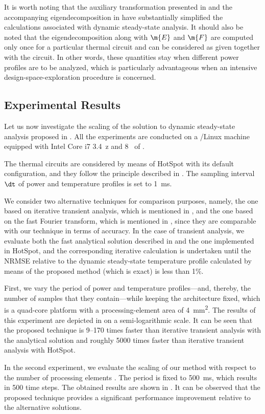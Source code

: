 It is worth noting that the auxiliary transformation presented in
 and the accompanying eigendecomposition in
 have substantially simplified the calculations
associated with dynamic steady-state analysis. It should also be noted that the
eigendecomposition along with $\m{E}$ and $\m{F}$ are computed only once for a
particular thermal  circuit and can be considered as given together with
the circuit. In other words, these quantities stay when different power profiles
are to be analyzed, which is particularly advantageous when an intensive
design-space-exploration procedure is concerned.

\subsection{Experimental Results}

Let us now investigate the scaling of the solution to dynamic steady-state
analysis proposed in . All the experiments
are conducted on a /Linux machine equipped with Intel Core i7
3.4~z and 8~ of .

The thermal  circuits are considered by means of HotSpot
\cite{skadron2003} with its default configuration, and they follow the principle
described in . The sampling interval $\dt$ of power and
temperature profiles is set to 1~ms.

We consider two alternative techniques for comparison purposes, namely, the one
based on iterative transient analysis, which is mentioned in
, and the one based on the fast Fourier
transform, which is mentioned in , since
they are comparable with our technique in terms of accuracy. In the case of
transient analysis, we evaluate both the fast analytical solution described in
 and the one implemented in HotSpot, and the
corresponding iterative calculation is undertaken until the \ac{NRMSE} relative
to the dynamic steady-state temperature profile calculated by means of the
proposed method (which is exact) is less than 1\%.

First, we vary the period \period of power and temperature profiles---and,
thereby, the number of samples \ns that they contain---while keeping the
architecture fixed, which is a quad-core platform with a processing-element area
of 4~mm\textsuperscript{2}. The results of this experiment are depicted in
 on a semi-logarithmic scale. It can be seen that the
proposed technique is 9--170 times faster than iterative transient analysis with
the analytical solution and roughly 5000 times faster than iterative transient
analysis with HotSpot.

In the second experiment, we evaluate the scaling of our method with respect to
the number of processing elements \np. The period is fixed to 500~ms, which
results in 500 time steps. The obtained results are shown in
. It can be observed that the proposed technique provides
a significant performance improvement relative to the alternative solutions.
